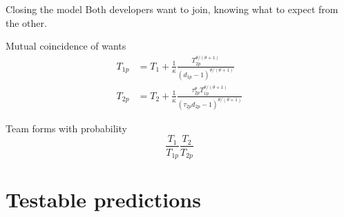 \documentclass[
  ignorenonframetext,
  aspectratio=169,
]{beamer}
\begin{document}
\begin{frame}{Closing the model}
\protect\hypertarget{closing-the-model}{}
Both developers want to join, knowing what to expect from the other.

\begin{block}{Mutual coincidence of wants}
\protect\hypertarget{mutual-coincidence-of-wants}{}
\[
\begin{aligned}
T_{1p} & = T_1 + \frac1\kappa \frac{T_{2p}^{\theta/(\theta+1)} }
{(d_{1p} - 1)^{\theta/(\theta+1)}} \\
T_{2p} &= T_2 + \frac1\kappa \frac{\tau_{2p}^\theta T_{1p}^{\theta/(\theta+1)} }
{(\tau_{2p} d_{2p} - 1)^{\theta/(\theta+1)}}
\end{aligned}
\]
\end{block}

\begin{block}{Team forms with probability}
\protect\hypertarget{team-forms-with-probability}{}
\[
\frac{T_1}{T_{1p}}
\frac{T_2}{T_{2p}}
\]
\end{block}
\end{frame}

\section{Testable predictions}\label{testable-predictions}
\end{document}
